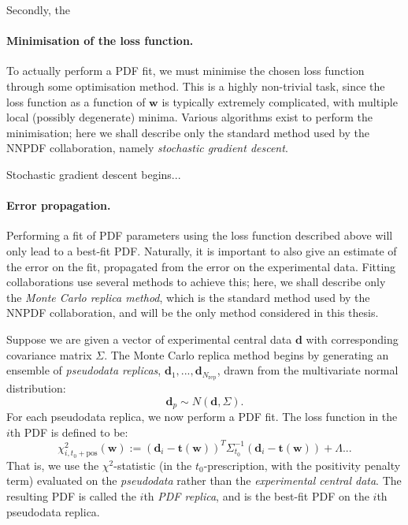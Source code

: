 \documentclass[withindex,glossary]{cam-thesis}
\renewcommand{\vec}[1]{\textbf{#1}} %
\begin{document}
Secondly, the 

\paragraph{Minimisation of the loss function.} To actually perform a PDF fit, we must minimise the chosen loss function through some optimisation method. This is a highly non-trivial task, since the loss function as a function of $\vec{w}$ is typically extremely complicated, with multiple local (possibly degenerate) minima. Various algorithms exist to perform the minimisation; here we shall describe only the standard method used by the NNPDF collaboration, namely \textit{stochastic gradient descent}.

Stochastic gradient descent begins...

\paragraph{Error propagation.} Performing a fit of PDF parameters using the loss function described above will only lead to a best-fit PDF. Naturally, it is important to also give an estimate of the error on the fit, propagated from the error on the experimental data. Fitting collaborations use several methods to achieve this; here, we shall describe only the \textit{Monte Carlo replica method}, which is the standard method used by the NNPDF collaboration, and will be the only method considered in this thesis.

Suppose we are given a vector of experimental central data $\vec{d}$ with corresponding covariance matrix $\Sigma$. The Monte Carlo replica method begins by generating an ensemble of \textit{pseudodata replicas}, $\vec{d}_1, ..., \vec{d}_{N_{\text{rep}}}$, drawn from the multivariate normal distribution:
\begin{equation}
\vec{d}_p \sim N(\vec{d}, \Sigma).
\end{equation}
For each pseudodata replica, we now perform a PDF fit. The loss function in the $i$th PDF is defined to be:
\begin{equation}
\chi^2_{i, t_0 + \text{pos}}(\vec{w}) := (\vec{d}_i - \vec{t}(\vec{w}))^T \Sigma_{t_0}^{-1} (\vec{d}_i - \vec{t}(\vec{w})) + \Lambda ...
\end{equation}
That is, we use the $\chi^2$-statistic (in the $t_0$-prescription, with the positivity penalty term) evaluated on the \textit{pseudodata} rather than the \textit{experimental central data}. The resulting PDF is called the $i$th \textit{PDF replica}, and is the best-fit PDF on the $i$th pseudodata replica. 
\end{document}
